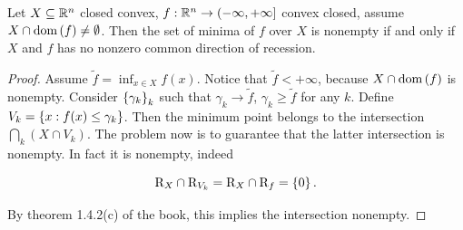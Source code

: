 \begin{proposition}[Book 3.2.2]
    
    Let $X \subseteq {\mathbb{R}^n}$ closed convex, $f : {\mathbb{R}^n} \to (-\infty,+\infty]$ convex closed, assume $X \cap \mathrm{dom}\left(f\right) \neq \emptyset$. Then the set of minima of $f$ over $X$ is nonempty if and only if $X$ and $f$ has no nonzero common direction of recession.

\end{proposition}

\begin{proof}
    
    Assume $\tilde{f} = \inf_{x \in X} f(x)$. Notice that $\tilde{f} < +\infty$, because $X \cap \mathrm{dom}\left(f\right)$ is nonempty. Consider $\left\{ \gamma_k \right\}_k$ such that $\gamma_k \to \tilde{f}$, $\gamma_k \ge \tilde{f}$ for any $k$. Define $V_k = \left\{ x : f(x) \le \gamma_k \right\}$. Then the minimum point belongs to the intersection $\bigcap_k (X \cap V_k)$. The problem now is to guarantee that the latter intersection is nonempty. In fact it is nonempty, indeed 

    \[ \mathrm{R}_{X} \cap \mathrm{R}_{V_k} = \mathrm{R}_{X} \cap \mathrm{R}_{f} = \left\{ 0 \right\}. \]

    By theorem 1.4.2(c) of the book, this implies the intersection nonempty.

\end{proof}




